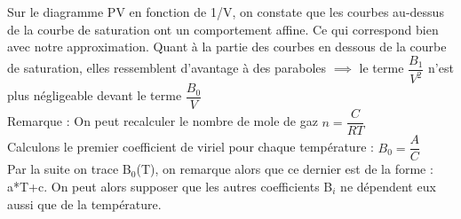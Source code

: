 \documentclass[12pt,a4paper]{article}
\begin{document}
Sur le diagramme PV en fonction de 1/V, on constate que les courbes au-dessus de la courbe de saturation ont un comportement affine. Ce qui correspond bien avec notre approximation. Quant à la partie des courbes en dessous de la courbe de saturation, elles ressemblent d'avantage à des paraboles $\implies$ le terme $\dfrac{B_{1}}{V^{2}}$ n'est plus négligeable devant le terme $\dfrac{B_{0}}{V}$ \\
Remarque : On peut recalculer le nombre de mole de gaz $n=\dfrac{C}{RT}$\\
Calculons le premier coefficient de viriel pour chaque température : 
$B_{0}=\dfrac{A}{C}$\\
Par la suite on trace B$_{0}$(T), on remarque alors que ce dernier est de la forme : a*T+c. On peut alors supposer que les autres coefficients B$_{i}$ ne dépendent eux aussi que de la température. 
\end{document}
